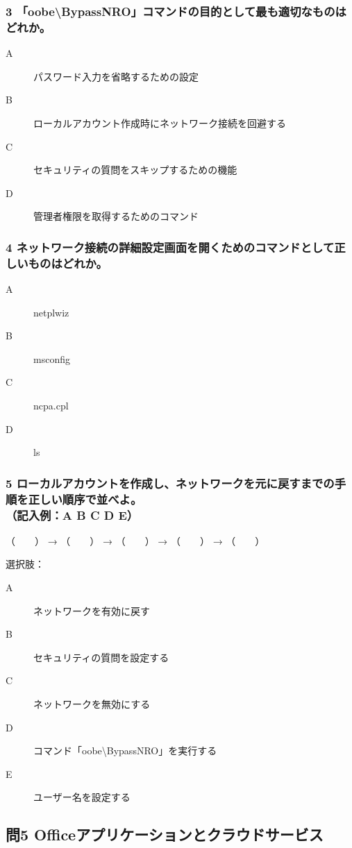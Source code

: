 \documentclass[a4paper,6pt]{jsarticle}
\begin{document}
\subsubsection*{3 「oobe\textbackslash{}BypassNRO」コマンドの目的として最も適切なものはどれか。}
\begin{description}
  \item[A] パスワード入力を省略するための設定
  \item[B] ローカルアカウント作成時にネットワーク接続を回避する
  \item[C] セキュリティの質問をスキップするための機能
  \item[D] 管理者権限を取得するためのコマンド
\end{description}

\subsubsection*{4 ネットワーク接続の詳細設定画面を開くためのコマンドとして正しいものはどれか。}
\begin{description}
  \item[A] netplwiz
  \item[B] msconfig
  \item[C] ncpa.cpl
  \item[D] ls
\end{description}

\subsubsection*{5 ローカルアカウントを作成し、ネットワークを元に戻すまでの手順を正しい順序で並べよ。\\（記入例：A B C D E）}

（　　） → （　　） → （　　） → （　　） → （　　）

選択肢： 
\begin{description}
  \item[A] ネットワークを有効に戻す  
  \item[B] セキュリティの質問を設定する  
  \item[C] ネットワークを無効にする  
  \item[D] コマンド「oobe\textbackslash{}BypassNRO」を実行する  
  \item[E] ユーザー名を設定する  
\end{description}

\vspace{-2mm}
\subsection*{問5 Officeアプリケーションとクラウドサービス}
\end{document}
